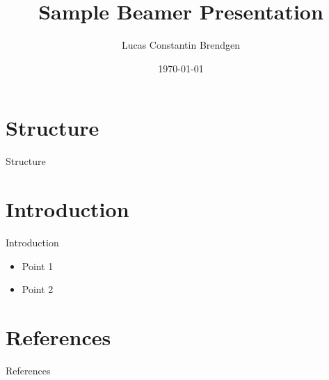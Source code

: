 \documentclass{beamer}
\title{Sample Beamer Presentation}
\author{Lucas Constantin Brendgen}
\date{\today}
\begin{document}
\begin{frame}
    \titlepage
\end{frame}

\section*{Structure}
\begin{frame}{Structure}
    \tableofcontents
\end{frame}

\section{Introduction}
\begin{frame}{Introduction}
    \begin{itemize}
        \item Point 1
        \item Point 2
    \end{itemize}
\end{frame}

\section{References}
\begin{frame}[allowframebreaks]{References}
    \printbibliography
\end{frame}
\end{document}
